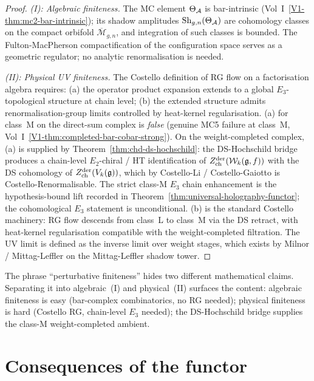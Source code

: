 \begin{proof}
\emph{(I): Algebraic finiteness.} The MC element $\Theta_{\mathcal{A}}$ is
bar-intrinsic (Vol~I~\ref*{V1-thm:mc2-bar-intrinsic}); its shadow
amplitudes $\mathrm{Sh}_{g,n}(\Theta_{\mathcal{A}})$ are cohomology classes
on the compact orbifold $\overline{\mathcal{M}}_{g,n}$, and
integration of such classes is bounded. The Fulton-MacPherson
compactification of the configuration space serves as a geometric
regulator; no analytic renormalisation is needed.

\emph{(II): Physical UV finiteness.} The Costello definition of
RG flow on a factorisation algebra requires: (a) the operator
product expansion extends to a global $E_3$-topological structure
at chain level; (b) the extended structure admits
renormalisation-group limits controlled by heat-kernel
regularisation. (a) for class~M on the direct-sum complex is
\emph{false} (genuine MC5 failure at class~M, Vol~I~\ref*{V1-thm:completed-bar-cobar-strong}).
On the weight-completed complex, (a) is supplied by
Theorem~\ref*{thm:chd-ds-hochschild}: the DS-Hochschild bridge
produces a chain-level $E_2$-chiral / HT identification of
$Z^{\mathrm{der}}_{\mathrm{ch}}(\mathcal{W}_k(\mathfrak{g}, f))$ with the DS cohomology of
$Z^{\mathrm{der}}_{\mathrm{ch}}(V_k(\mathfrak{g}))$, which by Costello-Li / Costello-Gaiotto is
	Costello-Renormalisable. The strict class-M $E_3$ chain enhancement
	is the hypothesis-bound lift recorded in
	Theorem~\ref{thm:universal-holography-functor}; the cohomological
$E_3$ statement is unconditional. (b) is the standard Costello
machinery: RG flow descends from class~L to class~M via the DS retract,
with heat-kernel regularisation compatible with the weight-completed
filtration. The UV limit is defined as the inverse limit over weight
stages, which exists by Milnor / Mittag-Leffler on the
Mittag-Leffler shadow tower.
\end{proof}

\begin{remark}
\label{rem:uhf-finiteness-separation}
The phrase ``perturbative finiteness'' hides two different
mathematical claims. Separating it into algebraic~(I) and physical~(II)
surfaces the content: algebraic finiteness is easy
(bar-complex combinatorics, no RG needed); physical finiteness is
hard (Costello RG, chain-level $E_3$ needed); the DS-Hochschild
bridge supplies the class-M weight-completed ambient.
\end{remark}

\section{Consequences of the functor}
\label{sec:uhf-consequences}


